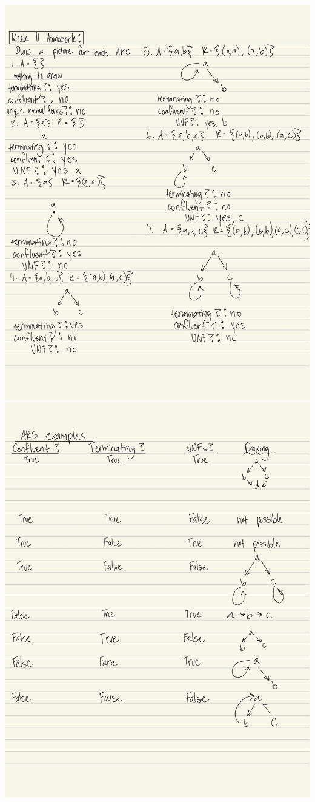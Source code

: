 \documentclass{article}
\theoremstyle{theorem}
\theoremstyle{definition}
\theoremstyle{remark}
\begin{document}
\includegraphics[scale=0.5]{ARS1}
\includegraphics[scale=0.5]{ARS2}
\end{document}
